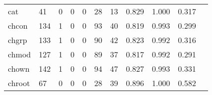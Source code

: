 \begin{longtable}{lp{1.2cm}p{1.2cm}p{1.2cm}p{1.2cm}p{1.2cm}p{1.2cm}p{1.2cm}p{1.2cm}p{1.2cm}p{1.2cm}}
cat       &                                    41 &                                                  0 &                                                  0 &                                                  0 &                                                 28 &                                                 13 &                                         0.829 &                                              1.000 &                                              0.317 \\
chcon     &                                   134 &                                                  1 &                                                  0 &                                                  0 &                                                 93 &                                                 40 &                                         0.819 &                                              0.993 &                                              0.299 \\
chgrp     &                                   133 &                                                  1 &                                                  0 &                                                  0 &                                                 90 &                                                 42 &                                         0.823 &                                              0.992 &                                              0.316 \\
chmod     &                                   127 &                                                  1 &                                                  0 &                                                  0 &                                                 89 &                                                 37 &                                         0.817 &                                              0.992 &                                              0.291 \\
chown     &                                   142 &                                                  1 &                                                  0 &                                                  0 &                                                 94 &                                                 47 &                                         0.827 &                                              0.993 &                                              0.331 \\
chroot    &                                    67 &                                                  0 &                                                  0 &                                                  0 &                                                 28 &                                                 39 &                                         0.896 &                                              1.000 &                                              0.582 \\

\end{longtable}

